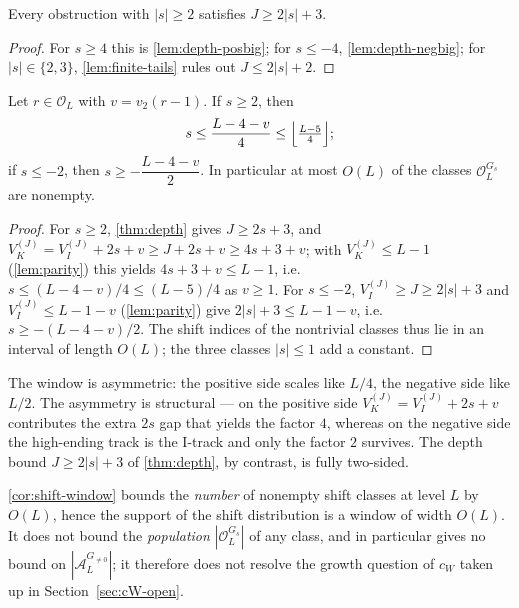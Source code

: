\documentclass[11pt,reqno]{amsart}
\newcommand{\Obs}{\mathcal{O}}
\newcommand{\Atom}{\mathcal{A}}
\newcommand{\Vk}{V_{K}}
\newcommand{\Vi}{V_{I}}
\newcommand{\vtwo}{v_{2}}
\begin{document}
\begin{theorem}\label{thm:depth}
Every obstruction with $|s| \ge 2$ satisfies $J \ge 2|s| + 3$.
\end{theorem}

\begin{proof}
For $s \ge 4$ this is \cref{lem:depth-posbig}; for $s \le -4$,
\cref{lem:depth-negbig}; for $|s| \in \{2,3\}$, \cref{lem:finite-tails} rules out
$J \le 2|s|+2$.
\qedhere
\end{proof}

\begin{corollary}\label{cor:shift-window}
Let $r \in \Obs_L$ with $v = \vtwo(r-1)$. If $s \ge 2$, then
\[
s \le \frac{L - 4 - v}{4} \le \Bigl\lfloor \tfrac{L-5}{4} \Bigr\rfloor ;
\]
if $s \le -2$, then $s \ge -\dfrac{L-4-v}{2}$. In particular at most $O(L)$ of the
classes $\Obs_L^{G_s}$ are nonempty.
\end{corollary}

\begin{proof}
For $s \ge 2$, \cref{thm:depth} gives $J \ge 2s+3$, and
$\Vk^{(J)} = \Vi^{(J)} + 2s + v \ge J + 2s + v \ge 4s + 3 + v$; with
$\Vk^{(J)} \le L-1$ (\cref{lem:parity}) this yields $4s + 3 + v \le L-1$, i.e.
$s \le (L-4-v)/4 \le (L-5)/4$ as $v \ge 1$. For $s \le -2$, $\Vi^{(J)} \ge J \ge 2|s|+3$
and $\Vi^{(J)} \le L-1-v$ (\cref{lem:parity}) give $2|s|+3 \le L-1-v$, i.e.
$s \ge -(L-4-v)/2$. The shift indices of the nontrivial classes thus lie in an
interval of length $O(L)$; the three classes $|s| \le 1$ add a constant.
\qedhere
\end{proof}

The window is asymmetric: the positive side scales like $L/4$, the negative side
like $L/2$. The asymmetry is structural --- on the positive side
$\Vk^{(J)} = \Vi^{(J)} + 2s + v$ contributes the extra $2s$ gap that yields the
factor $4$, whereas on the negative side the high-ending track is the I-track and
only the factor $2$ survives. The depth bound $J \ge 2|s| + 3$ of
\cref{thm:depth}, by contrast, is fully two-sided.

\begin{remark}\label{rem:window-scope}
\cref{cor:shift-window} bounds the \emph{number} of nonempty shift classes at
level $L$ by $O(L)$, hence the support of the shift distribution is a window of
width $O(L)$. It does not bound the \emph{population} $|\Obs_L^{G_s}|$ of any
class, and in particular gives no bound on $|\Atom_L^{G_{\ne 0}}|$; it therefore
does not resolve the growth question of $c_W$ taken up in
Section~\ref{sec:cW-open}.
\end{remark}
\end{document}
